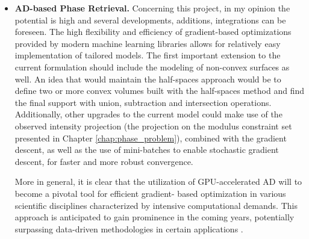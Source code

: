 \begin{itemize}
    \item \textbf{AD-based Phase Retrieval.} Concerning this project, in my opinion the potential is high and several 
    developments, additions, integrations can be foreseen. The high flexibility and efficiency of gradient-based 
    optimizations provided by modern machine learning libraries allows for relatively easy implementation of tailored 
    models. The first important extension to the current formulation should include the modeling of non-convex surfaces 
    as well. An idea that would maintain the half-spaces approach would be to define two or more convex volumes built 
    with the half-spaces method and find the final support with union, subtraction and intersection operations. 
    Additionally, other upgrades to the current model could make use of the observed intensity projection 
    (the projection on the modulus constraint set presented in Chapter \ref{chap:phase_problem}), combined with the 
    gradient descent, as well as the use of mini-batches to enable stochastic gradient descent, 
    for faster and more robust convergence. 
    
    More in general, it is clear that the utilization of GPU-accelerated AD will to become a pivotal tool for efficient gradient-
    based optimization in various scientific disciplines characterized by intensive computational demands. This approach 
    is anticipated to gain prominence in the coming years, potentially surpassing data-driven methodologies in certain 
    applications \cite{baydin2018,STIERLE2024120380, 10487099}.

\end{itemize}
